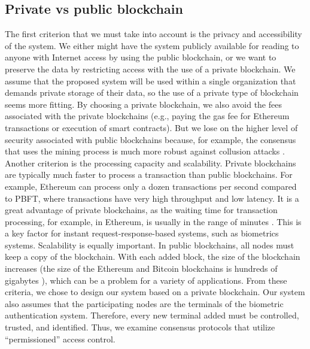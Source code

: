 \subsection{Private vs public blockchain}
\label{Private vs public blockchain}
The first criterion that we must take into account is the privacy and accessibility of the system. We either might have the system publicly available for reading to anyone with Internet access by using the public blockchain, or we want to preserve the data by restricting access with the use of a private blockchain. We assume that the proposed system will be used within a single organization that demands private storage of their data, so the use of a private type of blockchain seems more fitting. By choosing a private blockchain, we also avoid the fees associated with the private blockchains (e.g., paying the gas fee for Ethereum transactions or execution of smart contracts).  But we lose on the higher level of security associated with public blockchains because, for example, the consensus that uses the mining process is much more robust against collusion attacks \cite{BlockchainMeetsBiometrics}.
Another criterion is the processing capacity and scalability. Private blockchains are typically much faster to process a transaction than public blockchains. For example, Ethereum can process only a dozen transactions per second compared to PBFT, where transactions have very high throughput and low latency. It is a great advantage of private blockchains, as the waiting time for transaction processing, for example, in Ethereum, is usually in the range of minutes \cite{ConsensusInTheWild}. This is a key factor for instant request-response-based systems, such as biometrics systems. Scalability is equally important. In public blockchains, all nodes must keep a copy of the blockchain. With each added block, the size of the blockchain increases (the size of the Ethereum and Bitcoin blockchains is hundreds of gigabytes \cite{BlockchainMeetsBiometrics}), which can be a problem for a variety of applications. From these criteria, we chose to design our system based on a private blockchain. Our system also assumes that the participating nodes are the terminals of the biometric authentication system. Therefore, every new terminal added must be controlled, trusted, and identified. Thus, we examine consensus protocols that utilize ``permissioned'' access control. 
